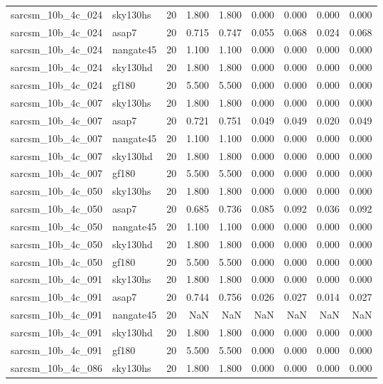 \begin{tabular}{llrrrrrrr}
sarcsm\_10b\_4c\_024 & sky130hs & 20 & 1.800 & 1.800 & 0.000 & 0.000 & 0.000 & 0.000 \\
sarcsm\_10b\_4c\_024 & asap7 & 20 & 0.715 & 0.747 & 0.055 & 0.068 & 0.024 & 0.068 \\
sarcsm\_10b\_4c\_024 & nangate45 & 20 & 1.100 & 1.100 & 0.000 & 0.000 & 0.000 & 0.000 \\
sarcsm\_10b\_4c\_024 & sky130hd & 20 & 1.800 & 1.800 & 0.000 & 0.000 & 0.000 & 0.000 \\
sarcsm\_10b\_4c\_024 & gf180 & 20 & 5.500 & 5.500 & 0.000 & 0.000 & 0.000 & 0.000 \\
sarcsm\_10b\_4c\_007 & sky130hs & 20 & 1.800 & 1.800 & 0.000 & 0.000 & 0.000 & 0.000 \\
sarcsm\_10b\_4c\_007 & asap7 & 20 & 0.721 & 0.751 & 0.049 & 0.049 & 0.020 & 0.049 \\
sarcsm\_10b\_4c\_007 & nangate45 & 20 & 1.100 & 1.100 & 0.000 & 0.000 & 0.000 & 0.000 \\
sarcsm\_10b\_4c\_007 & sky130hd & 20 & 1.800 & 1.800 & 0.000 & 0.000 & 0.000 & 0.000 \\
sarcsm\_10b\_4c\_007 & gf180 & 20 & 5.500 & 5.500 & 0.000 & 0.000 & 0.000 & 0.000 \\
sarcsm\_10b\_4c\_050 & sky130hs & 20 & 1.800 & 1.800 & 0.000 & 0.000 & 0.000 & 0.000 \\
sarcsm\_10b\_4c\_050 & asap7 & 20 & 0.685 & 0.736 & 0.085 & 0.092 & 0.036 & 0.092 \\
sarcsm\_10b\_4c\_050 & nangate45 & 20 & 1.100 & 1.100 & 0.000 & 0.000 & 0.000 & 0.000 \\
sarcsm\_10b\_4c\_050 & sky130hd & 20 & 1.800 & 1.800 & 0.000 & 0.000 & 0.000 & 0.000 \\
sarcsm\_10b\_4c\_050 & gf180 & 20 & 5.500 & 5.500 & 0.000 & 0.000 & 0.000 & 0.000 \\
sarcsm\_10b\_4c\_091 & sky130hs & 20 & 1.800 & 1.800 & 0.000 & 0.000 & 0.000 & 0.000 \\
sarcsm\_10b\_4c\_091 & asap7 & 20 & 0.744 & 0.756 & 0.026 & 0.027 & 0.014 & 0.027 \\
sarcsm\_10b\_4c\_091 & nangate45 & 20 & NaN & NaN & NaN & NaN & NaN & NaN \\
sarcsm\_10b\_4c\_091 & sky130hd & 20 & 1.800 & 1.800 & 0.000 & 0.000 & 0.000 & 0.000 \\
sarcsm\_10b\_4c\_091 & gf180 & 20 & 5.500 & 5.500 & 0.000 & 0.000 & 0.000 & 0.000 \\
sarcsm\_10b\_4c\_086 & sky130hs & 20 & 1.800 & 1.800 & 0.000 & 0.000 & 0.000 & 0.000 \\

\end{tabular}
